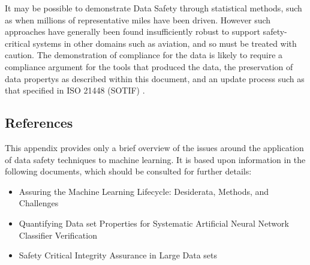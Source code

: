 It may be possible to demonstrate Data Safety through statistical methods,
such as when millions of representative miles have been driven.
However such approaches have generally been found insufficiently robust to support safety-critical systems in other domains
such as aviation, and so must be treated with caution.
The demonstration of compliance for the data is likely to require a compliance argument for the tools that produced the data,
the preservation of \glspl{data property} as described within this document, and an update process such as that specified in ISO 21448 (SOTIF)
\cite{citation:ISO21448}.

\subsection{References}
This appendix provides only a brief overview of the issues around the application of data safety techniques to machine learning. It is based upon \gls{information} in the following documents, which should be consulted for further details:
\begin{itemize}
\item Assuring the Machine Learning Lifecycle: Desiderata, Methods, and Challenges \cite{citation:Ashmore2019}
\item Quantifying Data set Properties for Systematic Artificial Neural Network Classifier Verification \cite{citation:Hond2020}
\item Safety Critical Integrity Assurance in Large Data sets \cite{citation:Sutherland2020}
\end{itemize}
